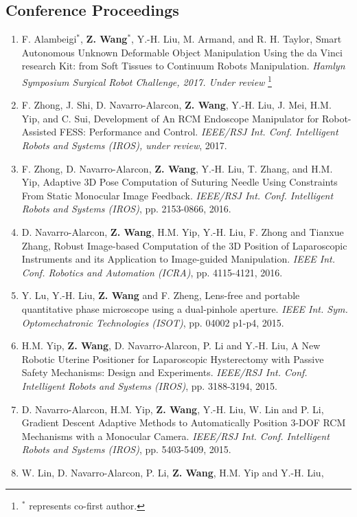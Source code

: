 \documentclass[10pt,letterpaper]{article}
\begin{document}
\subsection*{Conference Proceedings}
\begin{enumerate}
\item F. Alambeigi$^*$, \textbf{Z. Wang}$^*$, Y.-H. Liu, M. Armand, and R. H. Taylor,
  Smart Autonomous Unknown Deformable Object Manipulation Using the da Vinci research Kit: from Soft Tissues to Continuum Robots Manipulation.
  \textit{Hamlyn Symposium Surgical Robot Challenge, 2017. Under review}
  \let\thefootnote\relax\footnote{$^*$ represents co-first author.}
\item F. Zhong, J. Shi, D. Navarro-Alarcon, \textbf{Z. Wang}, Y.-H. Liu, J. Mei, H.M. Yip, and C. Sui,
  Development of An RCM Endoscope Manipulator for Robot-Assisted FESS: Performance and Control.
  \textit{{IEEE/RSJ} Int. Conf. Intelligent Robots and Systems (IROS), under review}, 2017.
\item F. Zhong, D. Navarro-Alarcon, \textbf{Z. Wang}, Y.-H. Liu, T. Zhang, and H.M. Yip,
  Adaptive 3D Pose Computation of Suturing Needle Using Constraints From Static Monocular Image Feedback.
  \textit{{IEEE/RSJ} Int. Conf. Intelligent Robots and Systems (IROS)}, pp. 2153-0866, 2016.
\item D. Navarro-Alarcon, \textbf{Z. Wang}, H.M. Yip, Y.-H. Liu, F. Zhong and Tianxue Zhang,
  Robust Image-based Computation of the 3D Position of Laparoscopic Instruments and its Application to Image-guided Manipulation.
  \textit{{IEEE} Int. Conf. Robotics and Automation (ICRA)}, pp. 4115-4121, 2016.
\item Y. Lu, Y.-H. Liu, \textbf{Z. Wang} and F. Zheng,
  Lens-free and portable quantitative phase microscope using a dual-pinhole aperture.
  \textit{{IEEE} Int. Sym. Optomechatronic Technologies (ISOT)}, pp. 04002 p1-p4, 2015.
\item H.M. Yip, \textbf{Z. Wang}, D. Navarro-Alarcon, P. Li and Y.-H. Liu,
  A New Robotic Uterine Positioner for Laparoscopic Hysterectomy with Passive Safety Mechanisms: Design and Experiments.
  \textit{{IEEE/RSJ} Int. Conf. Intelligent Robots and Systems (IROS)}, pp. 3188-3194, 2015.
\item D. Navarro-Alarcon, H.M. Yip, \textbf{Z. Wang}, Y.-H. Liu, W. Lin and P. Li,
  Gradient Descent Adaptive Methods to Automatically Position 3-DOF RCM Mechanisms with a Monocular Camera.
  \textit{{IEEE/RSJ} Int. Conf. Intelligent Robots and Systems (IROS)}, pp. 5403-5409, 2015.
\item W. Lin, D. Navarro-Alarcon, P. Li, \textbf{Z. Wang}, H.M. Yip and Y.-H. Liu,

\end{enumerate}
\end{document}
